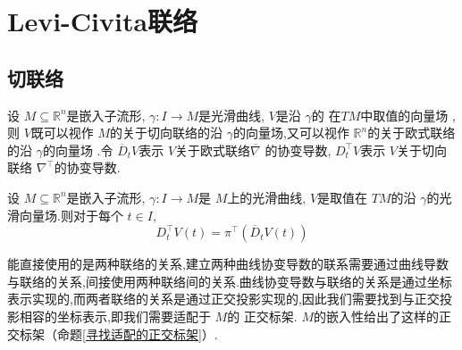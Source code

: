 \documentclass[../../几何与拓扑.tex]{subfiles}
\begin{document}
 
\ifSubfilesClassLoaded{
    \frontmatter

    \tableofcontents
    
    \mainmatter
}{}

\chapter{Levi-Civita联络}

\section{切联络}
\begin{definition}
    设 \(  M\subseteq \mathbb{R} ^{n}  \)是嵌入子流形, \(   \gamma :I\to M  \)是光滑曲线, \(  V  \)是沿 \(   \gamma   \)的 在\(  TM  \)中取值的向量场   ,则 \(  V  \)既可以视作 \(  M  \)的关于切向联络的沿 \(   \gamma   \)的向量场,又可以视作 \(  \mathbb{R} ^{n}  \)的关于欧式联络的沿 \(   \gamma   \)的向量场     .令 \(  \overline{D}_{t}V  \)表示 \(  V  \)关于欧式联络\(  \overline{ \nabla }  \) 的协变导数,     \(  D_{t}^{\top}V  \)表示 \(  V  \)关于切向联络   \(   \nabla ^{\top}  \)的协变导数. 
\end{definition}

\begin{proposition}
    设 \(  M\subseteq \mathbb{R} ^{n}  \)是嵌入子流形, \(   \gamma :I\to M  \)是 \(  M  \)上的光滑曲线, \(  V  \)是取值在 \(  TM  \)的沿 \(   \gamma   \)的光滑向量场.则对于每个 \(  t \in I  \), \[
    D_{t}^{\top}V\left( t \right)= \pi ^{\top}\left( \overline{D}_{t} V\left( t \right)  \right)  
    \]       
\end{proposition}

\begin{note}
    能直接使用的是两种联络的关系,建立两种曲线协变导数的联系需要通过曲线导数与联络的关系,间接使用两种联络间的关系.曲线协变导数与联络的关系是通过坐标表示实现的,而两者联络的关系是通过正交投影实现的,因此我们需要找到与正交投影相容的坐标表示,即我们需要适配于 \(  M  \)的 正交标架. \(  M  \)的嵌入性给出了这样的正交标架（命题\ref{寻找适配的正交标架}）. 
\end{note}
\end{document}
